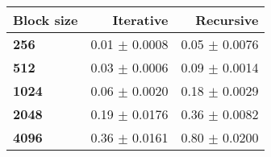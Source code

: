 \begin{tabular}{lrr}\toprule
\textbf{Block size}  & \textbf{Iterative} & \textbf{Recursive}\\\midrule
\textbf{256}  & 0.01 $\pm$ 0.0008 & 0.05 $\pm$ 0.0076\\
\textbf{512}  & 0.03 $\pm$ 0.0006 & 0.09 $\pm$ 0.0014\\
\textbf{1024}  & 0.06 $\pm$ 0.0020 & 0.18 $\pm$ 0.0029\\
\textbf{2048}  & 0.19 $\pm$ 0.0176 & 0.36 $\pm$ 0.0082\\
\textbf{4096} & 0.36 $\pm$ 0.0161 & 0.80 $\pm$ 0.0200\\
\bottomrule
\end{tabular}
